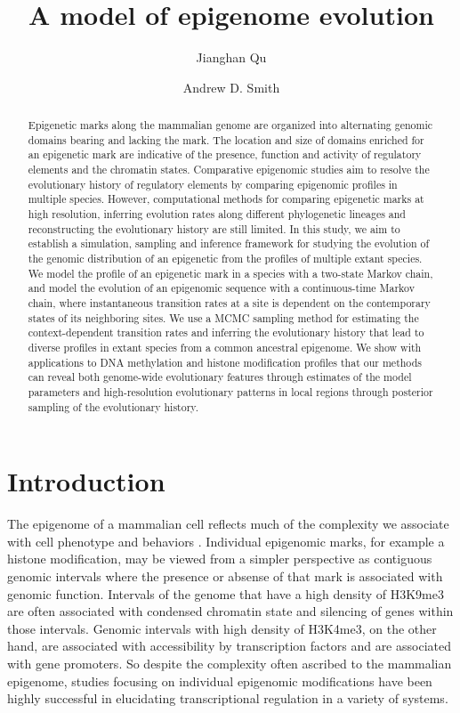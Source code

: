 \documentclass[11pt]{article}
\title{A model of epigenome evolution}
\author{Jianghan Qu \and Andrew D. Smith}
\begin{document}
\maketitle

\begin{abstract}
  Epigenetic marks along the mammalian genome are organized into
  alternating genomic domains bearing and lacking the mark. The
  location and size of domains enriched for an epigenetic mark are
  indicative of the presence, function and activity of regulatory
  elements and the chromatin states. Comparative epigenomic studies
  aim to resolve the evolutionary history of regulatory elements by
  comparing epigenomic profiles in multiple species.  However,
  computational methods for comparing epigenetic marks at high
  resolution, inferring evolution rates along different phylogenetic
  lineages and reconstructing the evolutionary history are still
  limited.  In this study, we aim to establish a simulation, sampling
  and inference framework for studying the evolution of the genomic
  distribution of an epigenetic from the profiles of multiple extant
  species.  We model the profile of an epigenetic mark in a species
  with a two-state Markov chain, and model the evolution of an
  epigenomic sequence with a continuous-time Markov chain, where
  instantaneous transition rates at a site is dependent on the
  contemporary states of its neighboring sites. We use a MCMC sampling
  method for estimating the context-dependent transition rates and
  inferring the evolutionary history that lead to diverse profiles in
  extant species from a common ancestral epigenome.  We show with
  applications to DNA methylation and histone modification profiles
  that our methods can reveal both genome-wide evolutionary features
  through estimates of the model parameters and high-resolution
  evolutionary patterns in local regions through posterior sampling of
  the evolutionary history.
\end{abstract}

\section{Introduction}

The epigenome of a mammalian cell reflects much of the complexity we
associate with cell phenotype and behaviors \cite{}. Individual
epigenomic marks, for example a histone modification, may be viewed
from a simpler perspective as contiguous genomic intervals where the
presence or absense of that mark is associated with genomic
function. Intervals of the genome that have a high density of H3K9me3
are often associated with condensed chromatin state and silencing of
genes within those intervals\cite{}. Genomic intervals with high
density of H3K4me3, on the other hand, are associated with
accessibility by transcription factors and are associated with gene
promoters\cite{}. So despite the complexity often ascribed to the
mammalian epigenome\cite{}, studies focusing on individual epigenomic
modifications have been highly successful in elucidating
transcriptional regulation in a variety of systems\cite{}.
\end{document}
